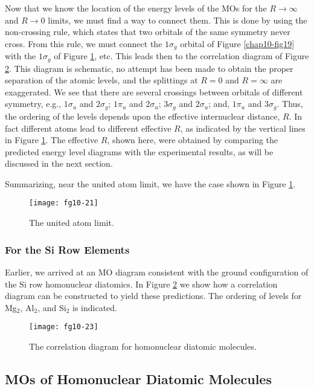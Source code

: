 Now that we know the location of the energy levels of the MOs for the
$R \rightarrow \infty$ and $R\rightarrow 0$ limits, we must find a way
to connect them.  This is done by using the non-crossing rule, which
states that two orbitals of the same symmetry never cross.  From this
rule, we must connect the $1 \sigma_g$ orbital of Figure
\ref{chap10-fig19} with the $1 \sigma_g$ of Figure \ref{chap10-fig21},
etc.  This leads then to the correlation diagram of Figure
\ref{chap10-fig23}. This diagram is schematic, no attempt has been
made to obtain the proper separation of the atomic levels, and the
splittings at $R = 0$ and $R = \infty$ are exaggerated.  We see that
there are several crossings between orbitals of different symmetry,
e.g., $1 \sigma_u$ and $2 \sigma_g$; $1 \pi_u$ and $2\sigma_u$; $3
\sigma_g$ and $2 \sigma_u$;  and, $1 \pi_u$ and $3 \sigma_g$.  Thus, 
the ordering of the levels depends upon the effective internuclear
distance, $R$. In fact different atoms lead to different effective
$R$, as indicated by the vertical lines in Figure
\ref{chap10-fig21}. The effective $R$, shown here, were obtained by
comparing the predicted energy level diagrams with the experimental
results, as will be discussed in the next section.

Summarizing, near the united atom limit, we have the case shown in
Figure \ref{chap10-fig21}.


\begin{figure}
\texttt{[image: fg10-21]}
\caption{The united atom limit.}
\label{chap10-fig21}
\end{figure}

\subsubsection{For the Si Row Elements}

Earlier, we arrived at an MO diagram consistent with
the ground configuration of the Si row homonuclear diatomics. In
Figure \ref{chap10-fig23} we show how a correlation diagram can be
constructed to yield these predictions. The ordering of levels for
Mg$_2$, Al$_2$, and Si$_2$ is indicated.


\begin{figure}
\texttt{[image: fg10-23]}
\caption{The correlation diagram for homonuclear diatomic molecules.}
\label{chap10-fig23}
\end{figure}


\subsection{MOs of Homonuclear Diatomic Molecules}

